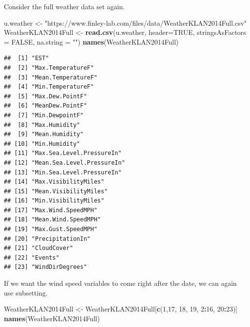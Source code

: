 \documentclass[
]{krantz}
\newenvironment{Shaded}{\begin{snugshade}}{\end{snugshade}}
\newcommand{\DataTypeTok}[1]{\textcolor[rgb]{0.13,0.29,0.53}{#1}}
\newcommand{\DecValTok}[1]{\textcolor[rgb]{0.00,0.00,0.81}{#1}}
\newcommand{\KeywordTok}[1]{\textcolor[rgb]{0.13,0.29,0.53}{\textbf{#1}}}
\newcommand{\NormalTok}[1]{#1}
\newcommand{\OperatorTok}[1]{\textcolor[rgb]{0.81,0.36,0.00}{\textbf{#1}}}
\newcommand{\OtherTok}[1]{\textcolor[rgb]{0.56,0.35,0.01}{#1}}
\newcommand{\StringTok}[1]{\textcolor[rgb]{0.31,0.60,0.02}{#1}}
\begin{document}
Consider the full weather data set again.

\begin{Shaded}
\begin{Highlighting}[]
\NormalTok{u.weather \textless{}{-}}\StringTok{ "https://www.finley{-}lab.com/files/data/WeatherKLAN2014Full.csv"}
\NormalTok{WeatherKLAN2014Full \textless{}{-}}\StringTok{ }\KeywordTok{read.csv}\NormalTok{(u.weather, }\DataTypeTok{header=}\OtherTok{TRUE}\NormalTok{, }
                                \DataTypeTok{stringsAsFactors =} \OtherTok{FALSE}\NormalTok{,}
                                \DataTypeTok{na.string =} \StringTok{""}\NormalTok{)}
\KeywordTok{names}\NormalTok{(WeatherKLAN2014Full)}
\end{Highlighting}
\end{Shaded}

\begin{verbatim}
##  [1] "EST"                      
##  [2] "Max.TemperatureF"         
##  [3] "Mean.TemperatureF"        
##  [4] "Min.TemperatureF"         
##  [5] "Max.Dew.PointF"           
##  [6] "MeanDew.PointF"           
##  [7] "Min.DewpointF"            
##  [8] "Max.Humidity"             
##  [9] "Mean.Humidity"            
## [10] "Min.Humidity"             
## [11] "Max.Sea.Level.PressureIn" 
## [12] "Mean.Sea.Level.PressureIn"
## [13] "Min.Sea.Level.PressureIn" 
## [14] "Max.VisibilityMiles"      
## [15] "Mean.VisibilityMiles"     
## [16] "Min.VisibilityMiles"      
## [17] "Max.Wind.SpeedMPH"        
## [18] "Mean.Wind.SpeedMPH"       
## [19] "Max.Gust.SpeedMPH"        
## [20] "PrecipitationIn"          
## [21] "CloudCover"               
## [22] "Events"                   
## [23] "WindDirDegrees"
\end{verbatim}

If we want the wind speed variables to come right after the date, we can again use subsetting.

\begin{Shaded}
\begin{Highlighting}[]
\NormalTok{WeatherKLAN2014Full \textless{}{-}}\StringTok{ }\NormalTok{WeatherKLAN2014Full[}\KeywordTok{c}\NormalTok{(}\DecValTok{1}\NormalTok{,}\DecValTok{17}\NormalTok{, }\DecValTok{18}\NormalTok{, }\DecValTok{19}\NormalTok{, }\DecValTok{2}\OperatorTok{:}\DecValTok{16}\NormalTok{, }\DecValTok{20}\OperatorTok{:}\DecValTok{23}\NormalTok{)]}
\KeywordTok{names}\NormalTok{(WeatherKLAN2014Full)}
\end{Highlighting}
\end{Shaded}
\end{document}
